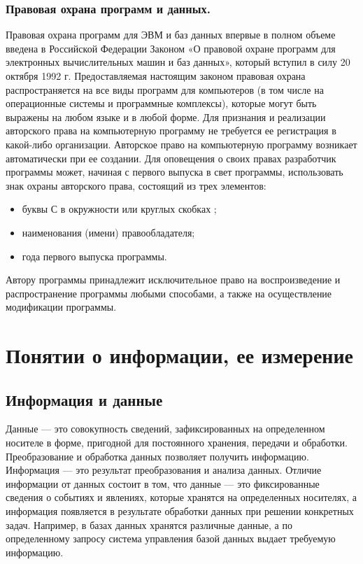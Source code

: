 \documentclass[a4paper]{article}
\begin{document}
\subsubsection{Правовая охрана программ и данных.}

Правовая охрана программ для ЭВМ и баз данных впервые в полном объеме введена в Российской Федерации Законом «О правовой охране программ для электронных вычислительных машин и баз данных», который вступил в силу 20 октября 1992 г. Предоставляемая настоящим законом правовая охрана распространяется на все виды программ для компьютеров (в том числе на операционные системы и программные комплексы), которые могут быть выражены на любом языке и в любой форме. Для признания и реализации авторского права на компьютерную программу не требуется ее регистрация в какой-либо организации. Авторское право на компьютерную программу возникает автоматически при ее создании. Для оповещения о своих правах разработчик программы может, начиная с первого выпуска в свет программы, использовать знак охраны авторского права, состоящий из трех элементов:

\begin{itemize}
\item буквы С в окружности или круглых скобках \textcopyright;
\item наименования (имени) правообладателя;
\item года первого выпуска программы.       
\end{itemize}
Автору программы принадлежит исключительное право на воспроизведение и распространение программы любыми способами, а также на осуществление модификации программы.

\section{Понятии о информации, ее измерение}

\subsection{Информация и данные}

Данные --- это совокупность сведений, зафиксированных на определенном носителе в форме, пригодной для постоянного хранения, передачи и обработки. Преобразование и обработка данных позволяет получить информацию.\\
Информация --- это результат преобразования и анализа данных. Отличие информации от данных состоит в том, что данные --- это фиксированные сведения о событиях и явлениях, которые хранятся на определенных носителях, а информация появляется в результате обработки данных при решении конкретных задач. Например, в базах данных хранятся различные данные, а по определенному запросу система управления базой данных выдает требуемую информацию.
\end{document}
